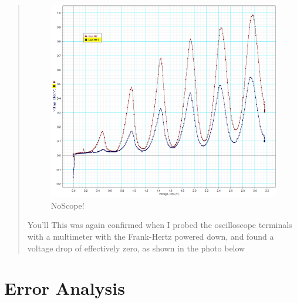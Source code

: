 \documentclass{amsart}
\begin{document}
\begin{enumerate}
{\begin{quote}
\begin{figure}[H]
\includegraphics[height=0.42790985\textheight]{scopeoff.png}
\caption{NoScope!}
\end{figure}

You'll This was again confirmed when I probed the oscilloscope terminals with a multimeter with the Frank-Hertz powered down, and found a voltage drop of effectively zero, as shown in the photo below
\end{quote}}
\end{enumerate}

\section{Error Analysis}
\end{document}
